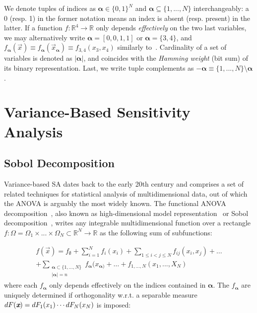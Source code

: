 \documentclass[review, twocolumn]{svjour3}          %
\begin{document}
We denote tuples of indices as $\pmb{\alpha} \in \{0, 1\}^N$ and $\pmb{\alpha} \subseteq \{1, ..., N\}$ interchangeably: a 0 (resp. 1) in the former notation means an index is absent (resp. present) in the latter. If a function $f: \mathbb{R}^4 \to \mathbb{R}$ only depends \emph{effectively} on the two last variables, we may alternatively write $\pmb{\alpha} = [0, 0, 1, 1]$ or $\pmb{\alpha} = \{3, 4\}$, and $f_{\pmb{\alpha}}(\vec{x}) \equiv f_{\pmb{\alpha}}(\vec{x}_{\pmb{\alpha}}) \equiv f_{3,4}(x_3, x_4)$ similarly to~\cite{Sudret:08, Owen:14}. Cardinality of a set of variables is denoted as $|\pmb{\alpha}|$, and coincides with the \emph{Hamming weight} (bit sum) of its binary representation. Last, we write tuple complements as $-\pmb{\alpha} \equiv \{1, ..., N\} \setminus \pmb{\alpha}$.

\section{Variance-Based Sensitivity Analysis} \label{sec:related_work}

\subsection{Sobol Decomposition} \label{sec:sobol_decomposition}

Variance-based SA dates back to the early 20th century and comprises a set of related techniques for statistical analysis of multidimensional data, out of which the ANOVA is arguably the most widely known. The functional ANOVA decomposition~\cite{ES:81}, also known as high-dimensional model representation~\cite{BK:15} or Sobol decomposition~\cite{Sobol:90}, writes any integrable multidimensional function over a rectangle $f: \Omega = \Omega_1 \times ... \times \Omega_N \subset \mathbb{R}^{N} \rightarrow \mathbb{R}$ as the following sum of subfunctions:

\begin{equation}
\label{eq:anova1}
\begin{aligned}
	f(\vec{x}) = f_{\emptyset} + \sum_{i=1}^N f_i(x_i) + \sum_{1 \le i < j \le N} f_{ij}(x_i, x_j) + \dots \\ + \sum_{\substack{\pmb{\alpha} \subset \{1,...,N\} \\ |\pmb{\alpha}| = n}} f_{\pmb{\alpha}}(x_{\pmb{\alpha})} + \dots + f_{1,...,N}(x_1,...,X_N)
\end{aligned}
\end{equation}
%
where each $f_{\pmb{\alpha}}$ only depends effectively on the indices contained in $\pmb{\alpha}$. The $f_{\pmb{\alpha}}$ are uniquely determined if orthogonality w.r.t. a separable measure $dF(\vec{x}) = dF_1(x_1) \\ \cdots dF_N(x_N)$ is imposed:
\end{document}
